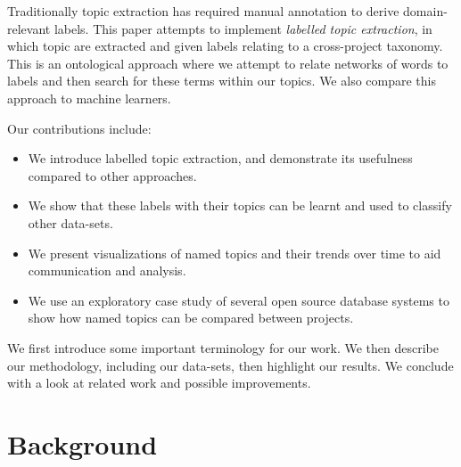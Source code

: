 \documentclass{acm_proc_article-sp}
\newcommand{\XXX}[1]{\textcolor{red}{{\it \textbf{[XXX: #1]}}}}
\begin{document}
Traditionally topic extraction has required manual annotation to derive domain-relevant labels. This paper attempts to implement \emph{labelled topic extraction}, in which topic are extracted and given labels relating to a cross-project taxonomy. This is an ontological approach where we attempt to relate networks of words to labels and then search for these terms within our topics. We also compare this approach to machine learners.

Our contributions include:
\begin{itemize}
\item  We introduce labelled topic extraction, and demonstrate its usefulness
  compared to other approaches.
\item We show that these labels with their topics can be learnt and used to classify other data-sets.
\item We present visualizations of named topics and their trends over time to aid communication and analysis.
\item We use an exploratory case study of
  several open source database systems to show how named topics can be compared between projects.
\end{itemize}

We first introduce some important terminology for our work. We then describe our methodology, including our data-sets, then highlight our results. We conclude with a look at related work and possible improvements.

\section{Background}
\end{document}
